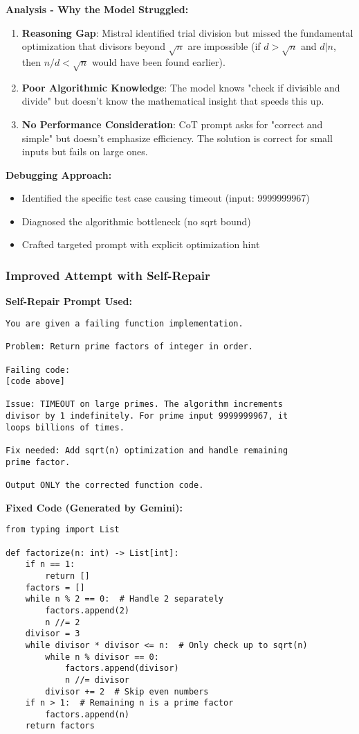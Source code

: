 \documentclass[11pt]{article}
\begin{document}
\textbf{Analysis - Why the Model Struggled:}
\begin{enumerate}
    \item \textbf{Reasoning Gap}: Mistral identified trial division but missed the fundamental optimization that divisors beyond $\sqrt{n}$ are impossible (if $d > \sqrt{n}$ and $d|n$, then $n/d < \sqrt{n}$ would have been found earlier).
    
    \item \textbf{Poor Algorithmic Knowledge}: The model knows "check if divisible and divide" but doesn't know the mathematical insight that speeds this up.
    
    \item \textbf{No Performance Consideration}: CoT prompt asks for "correct and simple" but doesn't emphasize efficiency. The solution is correct for small inputs but fails on large ones.
\end{enumerate}

\textbf{Debugging Approach:}
\begin{itemize}
    \item Identified the specific test case causing timeout (input: 9999999967)
    \item Diagnosed the algorithmic bottleneck (no sqrt bound)
    \item Crafted targeted prompt with explicit optimization hint
\end{itemize}

\subsubsection{Improved Attempt with Self-Repair}

\textbf{Self-Repair Prompt Used:}
\begin{lstlisting}
You are given a failing function implementation.

Problem: Return prime factors of integer in order.

Failing code:
[code above]

Issue: TIMEOUT on large primes. The algorithm increments 
divisor by 1 indefinitely. For prime input 9999999967, it 
loops billions of times.

Fix needed: Add sqrt(n) optimization and handle remaining 
prime factor.

Output ONLY the corrected function code.
\end{lstlisting}

\textbf{Fixed Code (Generated by Gemini):}
\begin{lstlisting}
from typing import List

def factorize(n: int) -> List[int]:
    if n == 1:
        return []
    factors = []
    while n % 2 == 0:  # Handle 2 separately
        factors.append(2)
        n //= 2
    divisor = 3
    while divisor * divisor <= n:  # Only check up to sqrt(n)
        while n % divisor == 0:
            factors.append(divisor)
            n //= divisor
        divisor += 2  # Skip even numbers
    if n > 1:  # Remaining n is a prime factor
        factors.append(n)
    return factors
\end{lstlisting}
\end{document}
